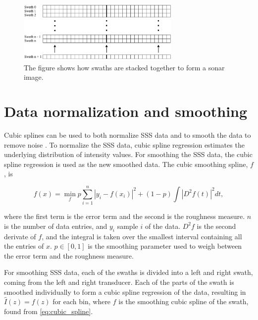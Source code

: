\hspace{0.5 cm}

\begin{figure}[h]
    \centering
    \includegraphics[width=0.7\textwidth]{figures/stacking_of_sonar_image.drawio.pdf}
    \caption{The figure shows how swaths are stacked together to form a sonar image.}
    \label{fig:stacking_of_sonar_image}
\end{figure}

\hspace{0.5 cm}

\section{Data normalization and smoothing}

Cubic splines can be used to both normalize SSS data \cite{ReitanHogstad2022Side-ScanAutonomy} and to smooth the data to remove noise \cite{Al-Rawi2017LandmarkImages}. To normalize the SSS data, cubic spline regression estimates the underlying distribution of intensity values. For smoothing the SSS data, the cubic spline regression is used as the new smoothed data. The cubic smoothing spline, $f$, is 

\begin{equation}
    {f}(x) = \min_{f} p \sum_{i=1}^n |y_i-f(x_i)|^2 + (1-p) \int|D^2f(t)|^2dt,
    \label{eq:cubic_spline}
\end{equation}

where the first term is the error term and the second is the roughness measure. $n$ is the number of data entries, and $y_i$ sample $i$ of the data. $D^2f$ is the second derivate of $f$, and the integral is taken over the smallest interval containing all the entries of $x$. $p \in [0,1]$ is the smoothing parameter used to weigh between the error term and the roughness measure. 

For smoothing SSS data, each of the swaths is divided into a left and right swath, coming from the left and right transducer. Each of the parts of the swath is smoothed individually to form a cubic spline regression of the data, resulting in $\hat{I}(z) = f(z)$ for each bin, where $f$ is the smoothing cubic spline of the swath, found from \cref{eq:cubic_spline}.

